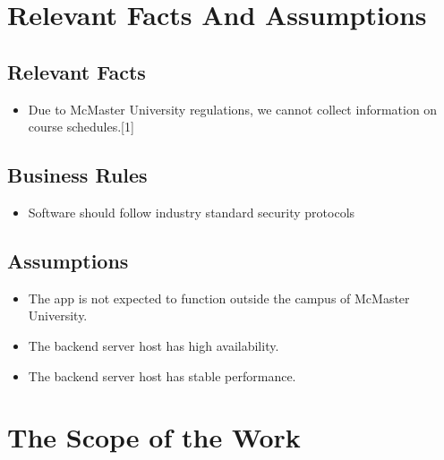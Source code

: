 \documentclass[12pt]{article}
\begin{document}
\section{Relevant Facts And Assumptions}
\subsection{Relevant Facts}
\begin{itemize}
  \item Due to McMaster University regulations, we cannot collect information on course schedules.[1]
\end{itemize}

\subsection{Business Rules}
\begin{itemize}
  \item Software should follow industry standard security protocols
\end{itemize}

\subsection{Assumptions}
\begin{itemize}
  \item The app is not expected to function outside the campus of McMaster University.
  \item The backend server host has high availability.
  \item The backend server host has stable performance.
\end{itemize}

\section{The Scope of the Work}
\end{document}
